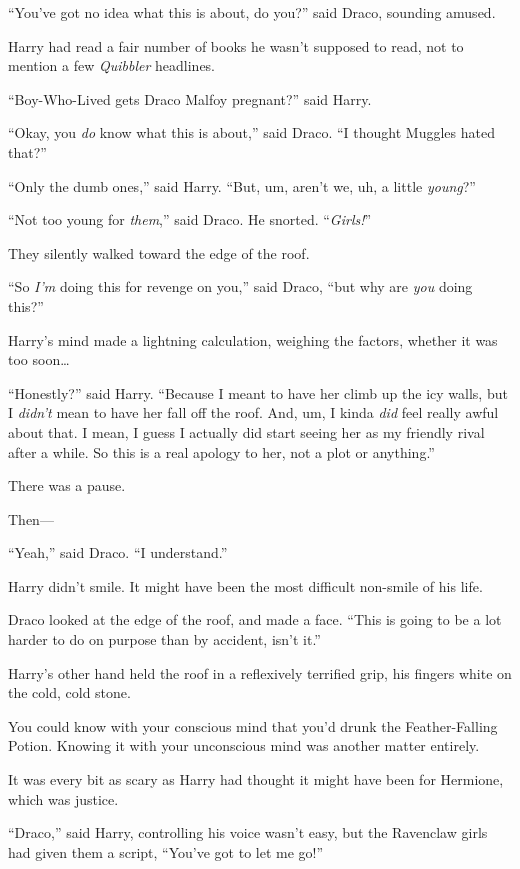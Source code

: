 “You’ve got no idea what this is about, do you?” said Draco, sounding amused.

Harry had read a fair number of books he wasn’t supposed to read, not to mention a few \emph{Quibbler} headlines.

“Boy-Who-Lived gets Draco Malfoy pregnant?” said Harry.

“Okay, you \emph{do} know what this is about,” said Draco.
“I thought Muggles hated that?”

“Only the dumb ones,” said Harry.
“But, um, aren’t we, uh, a little \emph{young}?”

“Not too young for \emph{them},” said Draco. He snorted. “\emph{Girls!}”

They silently walked toward the edge of the roof.

“So \emph{I’m} doing this for revenge on you,” said Draco, “but why are \emph{you} doing this?”

Harry’s mind made a lightning calculation, weighing the factors, whether it was too soon…

“Honestly?” said Harry.
“Because I meant to have her climb up the icy walls, but I \emph{didn’t} mean to have her fall off the roof. And, um, I kinda \emph{did} feel really awful about that. I mean, I guess I actually did start seeing her as my friendly rival after a while. So this is a real apology to her, not a plot or anything.”

There was a pause.

Then—

“Yeah,” said Draco.
“I understand.”

Harry didn’t smile. It might have been the most difficult non-smile of his life.

Draco looked at the edge of the roof, and made a face.
“This is going to be a lot harder to do on purpose than by accident, isn’t it.”

\later

Harry’s other hand held the roof in a reflexively terrified grip, his fingers white on the cold, cold stone.

You could know with your conscious mind that you’d drunk the Feather-Falling Potion. Knowing it with your unconscious mind was another matter entirely.

It was every bit as scary as Harry had thought it might have been for Hermione, which was justice.

“Draco,” said Harry, controlling his voice wasn’t easy, but the Ravenclaw girls had given them a script,
“You’ve got to let me go!”

